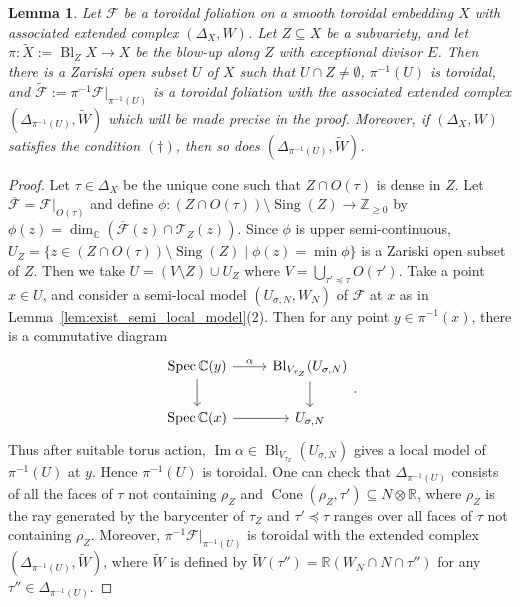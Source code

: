 \documentclass[12pt,reqno]{amsart}
\newtheorem{lemma}[theorem]{Lemma}
\theoremstyle{definition}
\newcommand{\on}{\operatorname}
\newcommand\cF{{\mathcal{F}}}
\newcommand\cT{{\mathcal{T}}}
\newcommand\bC{{\mathbb C}}
\newcommand\bR{{\mathbb R}}
\newcommand\bZ{{\mathbb Z}}
\begin{document}
\begin{lemma}\label{lem:blowup_toroidal_model}
    Let $\cF$ be a toroidal foliation on a smooth toroidal embedding $X$ with associated extended complex $(\Delta_X,W)$. Let $Z\subseteq X$ be a subvariety, and let $\pi\colon \widetilde{X}:=\on{Bl}_ZX \to X$ be the blow-up along $Z$ with exceptional divisor $E$. 
    Then there is a Zariski open subset $U$ of $X$ such that $U\cap Z\neq\emptyset$, $\pi^{-1}(U)$ is toroidal, and $\widetilde{\cF}:=\pi^{-1}\cF\vert_{\pi^{-1}(U)}$ is a toroidal foliation with the associated extended complex $(\Delta_{\pi^{-1}(U)},\widetilde{W})$ which will be made precise in the proof. Moreover, if $(\Delta_X,W)$ satisfies the condition $(\dagger)$, then so does $(\Delta_{\pi^{-1}(U)},\widetilde{W})$.
\end{lemma}
\begin{proof}
Let $\tau\in\Delta_X$ be the unique cone such that $Z\cap O(\tau)$ is dense in $Z$. Let $\overline{\cF}=\cF\vert_{O(\tau)}$ and define $\phi\colon (Z\cap O(\tau))\setminus\on{Sing}(Z)\to\bZ_{\geq 0}$ by $\phi(z) = \dim_\bC(\overline{\cF}(z)\cap\cT_{Z}(z))$. Since $\phi$ is upper semi-continuous, $U_Z = \{z\in (Z\cap O(\tau))\setminus\on{Sing}(Z)\mid\phi(z) = \min\phi\}$ is a Zariski open subset of $Z$. Then we take $U = (V\setminus Z)\cup U_Z$ where $V=\bigcup_{\tau'\preceq\tau}O(\tau')$. Take a point $x\in U$, and consider a semi-local model $(U_{\sigma,N},W_N)$ of $\cF$ at $x$ as in Lemma~\ref{lem:exist_semi_local_model}(2). Then for any point $y\in\pi^{-1}(x)$, there is a commutative diagram
\[
\begin{tikzcd}
    \on{Spec}\bC(y)\arrow[r,"\alpha"]\arrow[d] & \on{Bl}_{V_{\tau_Z}}(U_{\sigma,N})\arrow[d]\\
    \on{Spec}\bC(x)\arrow[r] & U_{\sigma,N}
\end{tikzcd}.
\]
Thus after suitable torus action, $\on{Im}\alpha\in\on{Bl}_{V_{\tau_Z}}(U_{\sigma,N})$ gives a local model of $\pi^{-1}(U)$ at $y$. Hence $\pi^{-1}(U)$ is toroidal. One can check that $\Delta_{\pi^{-1}(U)}$ consists of all the faces of $\tau$ not containing $\rho_Z$ and $\on{Cone}(\rho_Z,\tau')\subseteq N\otimes \bR$, where $\rho_Z$ is the ray generated by the barycenter of $\tau_Z$  and $\tau'\preceq \tau$ ranges over all faces of $\tau$ not containing $\rho_Z$. Moreover, $\pi^{-1}\cF\vert_{\pi^{-1}(U)}$ is toroidal with the extended complex $(\Delta_{\pi^{-1}(U)},\widetilde{W})$, where $\widetilde{W}$ is defined by $\widetilde{W}(\tau'')=\bR(W_N\cap N \cap \tau'')$ for any $\tau''\in \Delta_{\pi^{-1}(U)}$. 


\end{proof}
\end{document}
